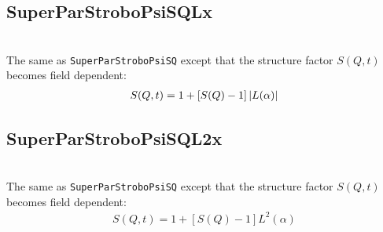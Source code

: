 \subsection{SuperParStroboPsiSQLx}  ~\\
The same as {\tt SuperParStroboPsiSQ} except that the structure factor $S(Q,t)$ becomes field
dependent:
\begin{align}
S(Q,t) = 1+\left[S(Q)-1\right] \abs{L(\alpha)}
\end{align}



\subsection{SuperParStroboPsiSQL2x}  ~\\
The same as {\tt SuperParStroboPsiSQ} except that the structure factor $S(Q,t)$ becomes field
dependent:
\begin{align}
S(Q,t) = 1+\left[S(Q)-1\right] L^2(\alpha)
\end{align}
